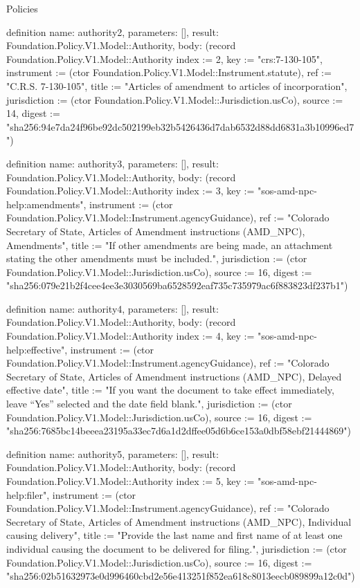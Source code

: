 \begin{lexlean}{Policies}
\begin{semanticmodule}
definition{
  name: authority2,
  parameters: [],
  result: Foundation.Policy.V1.Model::Authority,
  body: (record Foundation.Policy.V1.Model::Authority {index := 2, key := "crs:7-130-105", instrument := (ctor Foundation.Policy.V1.Model::Instrument.statute), ref := "C.R.S. 7-130-105", title := "Articles of amendment to articles of incorporation", jurisdiction := (ctor Foundation.Policy.V1.Model::Jurisdiction.usCo), source := 14, digest := "sha256:94e7da24f96be92dc502199eb32b5426436d7dab6532d88dd6831a3b10996ed7"})
}

definition{
  name: authority3,
  parameters: [],
  result: Foundation.Policy.V1.Model::Authority,
  body: (record Foundation.Policy.V1.Model::Authority {index := 3, key := "sos-amd-npc-help:amendments", instrument := (ctor Foundation.Policy.V1.Model::Instrument.agencyGuidance), ref := "Colorado Secretary of State, Articles of Amendment instructions (AMD_NPC), Amendments", title := "If other amendments are being made, an attachment stating the other amendments must be included.", jurisdiction := (ctor Foundation.Policy.V1.Model::Jurisdiction.usCo), source := 16, digest := "sha256:079e21b2f4cee4ee3e3030569ba6528592eaf735c735979ac6f883823df237b1"})
}

definition{
  name: authority4,
  parameters: [],
  result: Foundation.Policy.V1.Model::Authority,
  body: (record Foundation.Policy.V1.Model::Authority {index := 4, key := "sos-amd-npc-help:effective", instrument := (ctor Foundation.Policy.V1.Model::Instrument.agencyGuidance), ref := "Colorado Secretary of State, Articles of Amendment instructions (AMD_NPC), Delayed effective date", title := "If you want the document to take effect immediately, leave “Yes” selected and the date field blank.", jurisdiction := (ctor Foundation.Policy.V1.Model::Jurisdiction.usCo), source := 16, digest := "sha256:7685bc14beeea23195a33ec7d6a1d2dffee05d6b6ce153a0dbf58ebf21444869"})
}

definition{
  name: authority5,
  parameters: [],
  result: Foundation.Policy.V1.Model::Authority,
  body: (record Foundation.Policy.V1.Model::Authority {index := 5, key := "sos-amd-npc-help:filer", instrument := (ctor Foundation.Policy.V1.Model::Instrument.agencyGuidance), ref := "Colorado Secretary of State, Articles of Amendment instructions (AMD_NPC), Individual causing delivery", title := "Provide the last name and first name of at least one individual causing the document to be delivered for filing.", jurisdiction := (ctor Foundation.Policy.V1.Model::Jurisdiction.usCo), source := 16, digest := "sha256:02b51632973e0d996460cbd2e56e413251f852ea618c8013eecb089899a12c0d"})
}


\end{semanticmodule}
\end{lexlean}
